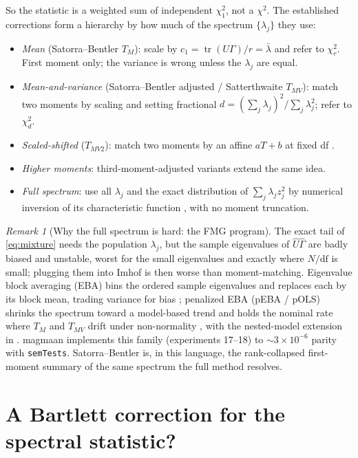 \documentclass[11pt]{article}
\newcommand{\tr}{\operatorname{tr}}
\theoremstyle{plain}
\theoremstyle{remark}
\newtheorem*{remark}{Remark}
\begin{document}
So the statistic is a weighted sum of independent $\chi^2_1$, not a $\chi^2$. The
established corrections form a hierarchy by how much of the spectrum
$\{\lambda_j\}$ they use:
\begin{itemize}
\item \emph{Mean} (Satorra--Bentler $T_M$): scale by
$c_1 = \tr(U\Gamma)/r = \bar\lambda$ and refer to $\chi^2_r$. First moment only;
the variance is wrong unless the $\lambda_j$ are equal.
\item \emph{Mean-and-variance} (Satorra--Bentler adjusted / Satterthwaite
$T_{MV}$): match two moments by scaling and setting fractional
$d = (\sum_j\lambda_j)^2/\sum_j\lambda_j^2$; refer to $\chi^2_d$.
\item \emph{Scaled-shifted} ($T_{MV2}$): match two moments by an affine $aT+b$ at
fixed df \cite{asparouhovmuthen2010}.
\item \emph{Higher moments}: third-moment-adjusted variants extend the same idea.
\item \emph{Full spectrum}: use all $\lambda_j$ and the exact distribution of
$\sum_j\lambda_j z_j^2$ by numerical inversion of its characteristic function
\cite{imhof1961,davies1980}, with no moment truncation.
\end{itemize}

\begin{remark}[Why the full spectrum is hard: the FMG program]
The exact tail of \eqref{eq:mixture} needs the population $\lambda_j$, but the
sample eigenvalues of $\hat U\hat\Gamma$ are badly biased and unstable, worst for
the small eigenvalues and exactly where $N/\mathrm{df}$ is small; plugging them
into Imhof is then worse than moment-matching. Eigenvalue block averaging (EBA)
bins the ordered sample eigenvalues and replaces each by its block mean, trading
variance for bias \cite{foldnesgronneberg2018}; penalized EBA (pEBA / pOLS)
shrinks the spectrum toward a model-based trend and holds the nominal rate where
$T_M$ and $T_{MV}$ drift under non-normality \cite{foldnesmossgronneberg2025},
with the nested-model extension in \cite{foldnesmossgronneberg2026}. magmaan
implements this family (experiments 17--18) to $\sim$$3\times10^{-6}$ parity with
\texttt{semTests}. Satorra--Bentler is, in this language, the rank-collapsed
first-moment summary of the same spectrum the full method resolves.
\end{remark}

\section{A Bartlett correction for the spectral statistic?}
\label{sec:bartlett-spectrum}
\end{document}
